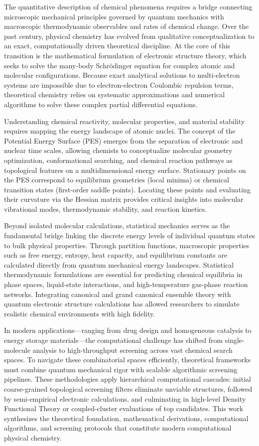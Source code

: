 \documentclass[12pt]{article}
\begin{document}
The quantitative description of chemical phenomena requires a bridge connecting microscopic mechanical principles governed by quantum mechanics with macroscopic thermodynamic observables and rates of chemical change. Over the past century, physical chemistry has evolved from qualitative conceptualization to an exact, computationally driven theoretical discipline. At the core of this transition is the mathematical formulation of electronic structure theory, which seeks to solve the many-body Schrödinger equation for complex atomic and molecular configurations. Because exact analytical solutions to multi-electron systems are impossible due to electron-electron Coulombic repulsion terms, theoretical chemistry relies on systematic approximations and numerical algorithms to solve these complex partial differential equations.

Understanding chemical reactivity, molecular properties, and material stability requires mapping the energy landscape of atomic nuclei. The concept of the Potential Energy Surface (PES) emerges from the separation of electronic and nuclear time scales, allowing chemists to conceptualize molecular geometry optimization, conformational searching, and chemical reaction pathways as topological features on a multidimensional energy surface. Stationary points on the PES correspond to equilibrium geometries (local minima) or chemical transition states (first-order saddle points). Locating these points and evaluating their curvature via the Hessian matrix provides critical insights into molecular vibrational modes, thermodynamic stability, and reaction kinetics.

Beyond isolated molecular calculations, statistical mechanics serves as the fundamental bridge linking the discrete energy levels of individual quantum states to bulk physical properties. Through partition functions, macroscopic properties such as free energy, entropy, heat capacity, and equilibrium constants are calculated directly from quantum mechanical energy landscapes. Statistical thermodynamic formulations are essential for predicting chemical equilibria in phase spaces, liquid-state interactions, and high-temperature gas-phase reaction networks. Integrating canonical and grand canonical ensemble theory with quantum electronic structure calculations has allowed researchers to simulate realistic chemical environments with high fidelity.

In modern applications—ranging from drug design and homogeneous catalysis to energy storage materials—the computational challenge has shifted from single-molecule analysis to high-throughput screening across vast chemical search spaces. To navigate these combinatorial spaces efficiently, theoretical frameworks must combine quantum mechanical rigor with scalable algorithmic screening pipelines. These methodologies apply hierarchical computational cascades: initial coarse-grained topological screening filters eliminate unviable structures, followed by semi-empirical electronic calculations, and culminating in high-level Density Functional Theory or coupled-cluster evaluations of top candidates. This work synthesizes the theoretical foundation, mathematical derivations, computational algorithms, and screening protocols that constitute modern computational physical chemistry.
\end{document}
